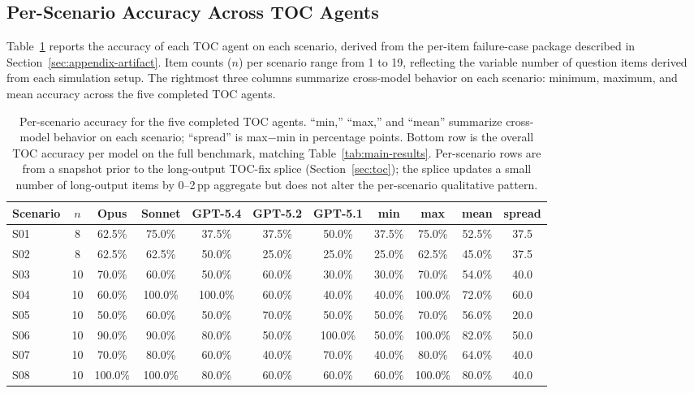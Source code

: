 \documentclass{article}
\begin{document}
\subsection{Per-Scenario Accuracy Across TOC Agents}

Table~\ref{tab:appendix-scenario-grid} reports the accuracy of each TOC agent on each scenario, derived from the per-item failure-case package described in Section~\ref{sec:appendix-artifact}. Item counts ($n$) per scenario range from 1 to 19, reflecting the variable number of question items derived from each simulation setup. The rightmost three columns summarize cross-model behavior on each scenario: minimum, maximum, and mean accuracy across the five completed TOC agents.

\begin{table}[h]
\centering
\scriptsize
\setlength{\tabcolsep}{4pt}
\caption{Per-scenario accuracy for the five completed TOC agents. ``min,'' ``max,'' and ``mean'' summarize cross-model behavior on each scenario; ``spread'' is max$-$min in percentage points. Bottom row is the overall TOC accuracy per model on the full benchmark, matching Table~\ref{tab:main-results}. Per-scenario rows are from a snapshot prior to the long-output TOC-fix splice (Section~\ref{sec:toc}); the splice updates a small number of long-output items by 0--2\,pp aggregate but does not alter the per-scenario qualitative pattern.}
\label{tab:appendix-scenario-grid}
\begin{tabular}{lcccccccccc}
\toprule
Scenario & $n$ & Opus & Sonnet & GPT-5.4 & GPT-5.2 & GPT-5.1 & min & max & mean & spread \\
\midrule
S01 & 8 & 62.5\% & 75.0\% & 37.5\% & 37.5\% & 50.0\% & 37.5\% & 75.0\% & 52.5\% & 37.5 \\
S02 & 8 & 62.5\% & 62.5\% & 50.0\% & 25.0\% & 25.0\% & 25.0\% & 62.5\% & 45.0\% & 37.5 \\
S03 & 10 & 70.0\% & 60.0\% & 50.0\% & 60.0\% & 30.0\% & 30.0\% & 70.0\% & 54.0\% & 40.0 \\
S04 & 10 & 60.0\% & 100.0\% & 100.0\% & 60.0\% & 40.0\% & 40.0\% & 100.0\% & 72.0\% & 60.0 \\
S05 & 10 & 50.0\% & 60.0\% & 50.0\% & 70.0\% & 50.0\% & 50.0\% & 70.0\% & 56.0\% & 20.0 \\
S06 & 10 & 90.0\% & 90.0\% & 80.0\% & 50.0\% & 100.0\% & 50.0\% & 100.0\% & 82.0\% & 50.0 \\
S07 & 10 & 70.0\% & 80.0\% & 60.0\% & 40.0\% & 70.0\% & 40.0\% & 80.0\% & 64.0\% & 40.0 \\
S08 & 10 & 100.0\% & 100.0\% & 80.0\% & 60.0\% & 60.0\% & 60.0\% & 100.0\% & 80.0\% & 40.0 \\

\end{tabular}
\end{table}
\end{document}
